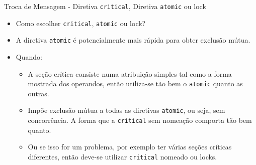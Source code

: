 	\begin{frame}{Troca de Mensagem - Diretiva {\tt critical}, Diretiva {\tt atomic} ou lock}
		\begin{itemize}
			\setlength\itemsep{1.2em}
			\item Como escolher {\tt critical}, {\tt atomic} ou lock?
					\bigskip
			\item A diretiva {\tt atomic} é potencialmente mais rápida para obter exclusão mútua.
			\item Quando:
			\begin{itemize}
				\item A seção crítica consiste numa atribuição simples tal como a forma mostrada dos operandos, então utiliza-se tão bem o {\tt atomic} quanto as outras.
				\item Impõe exclusão mútua a todas as diretivas {\tt atomic}, ou seja, sem concorrência. A forma que a {\tt critical} sem nomeação comporta tão bem quanto.
				\item Ou se isso for um problema, por exemplo ter várias seções críticas diferentes, então deve-se utilizar {\tt critical} nomeado ou locks.
			\end{itemize}
		\end{itemize}
	\end{frame}


